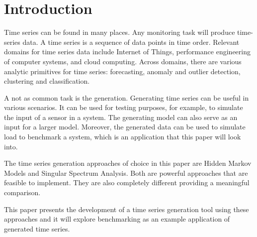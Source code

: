 
\chapter{Introduction}\label{chapter:introduction}

Time series can be found in many places. Any monitoring task will produce time-series data.  A time series is a sequence of data points in time order.  Relevant domains for time series data include Internet of Things,  performance engineering of computer systems, and cloud computing. Across domains, there are various analytic primitives for time series: forecasting, anomaly and outlier detection, clustering and classification.

A not as common task is the generation. Generating time series can be useful in various scenarios. It can be used for testing purposes, for example, to simulate the input of a sensor in a system. The generating model can also serve as an input for a larger model. Moreover, the generated data can be used to simulate load to benchmark a system, which is an application that this paper will look into. 

The time series generation approaches of choice in this paper are Hidden Markov Models and Singular Spectrum Analysis. Both are powerful approaches that are feasible to implement. They are also completely different providing a meaningful comparison. 

This paper presents the development of a time series generation tool using these approaches and it will explore benchmarking as an example application of generated time series. 